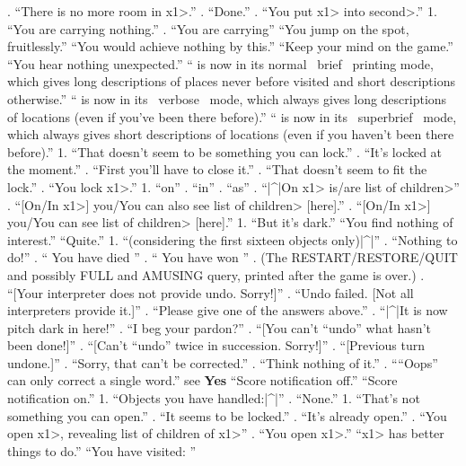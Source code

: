 . ``There is no more room in \<x1>.''
. ``Done.''
. ``You put \<x1> into \<second>.''
   1. ``You are carrying nothing.''
. ``You are carrying'' 
   ``You jump on the spot, fruitlessly.''
 ``You would achieve nothing by this.''
   ``Keep your mind on the game.''
  ``You hear nothing unexpected.''
  `` is now in its normal ~brief~ printing mode, which gives
long descriptions of places never before visited and short
descriptions otherwise.''
  `` is now in its ~verbose~ mode, which always gives long
descriptions of locations (even if you've been there before).''
  `` is now in its ~superbrief~ mode, which always gives short
descriptions of locations (even if you haven't been there before).''
   1. ``That doesn't seem to be something you can lock.''
. ``It's locked at the moment.''
. ``First you'll have to close it.''
. ``That doesn't seem to fit the lock.''
. ``You lock \<x1>.''
 1. ``on''
. ``in''
. ``as'' 
. ``|^|On \<x1> is/are \<list of children>''
. ``[On/In \<x1>] you/You can also see \<list of children> [here].''
. ``[On/In \<x1>] you/You can see \<list of children> [here].''
 1. ``But it's dark.''
\N   ``You find nothing of interest.''
   ``Quite.''
 1. ``(considering the first sixteen objects only)|^|''
. ``Nothing to do!''
. `` You have died ''
. `` You have won ''
. (The RESTART/RESTORE/QUIT and possibly FULL
and AMUSING query, printed after the game is over.)
. ``[Your interpreter does not provide undo. Sorry!]''
. ``Undo failed. [Not all interpreters provide it.]''
. ``Please give one of the answers above.''
. ``|^|It is now pitch dark in here!''
. ``I beg your pardon?''
. ``[You can't ``undo'' what hasn't been done!]''
. ``[Can't ``undo'' twice in succession. Sorry!]''
. ``[Previous turn undone.]''
. ``Sorry, that can't be corrected.''
. ``Think nothing of it.''
. ````Oops'' can only correct a single word.''
    see {\bf Yes}
 ``Score notification off.''
 ``Score notification on.''
 1. ``Objects you have handled:|^|''
. ``None.''
   1. ``That's not something you can open.''
. ``It seems to be locked.''
. ``It's already open.''
. ``You open \<x1>, revealing \<list of children of x1>''
. ``You open \<x1>.''
  ``\<x1> has better things to do.''
  ``You have visited: '' 
